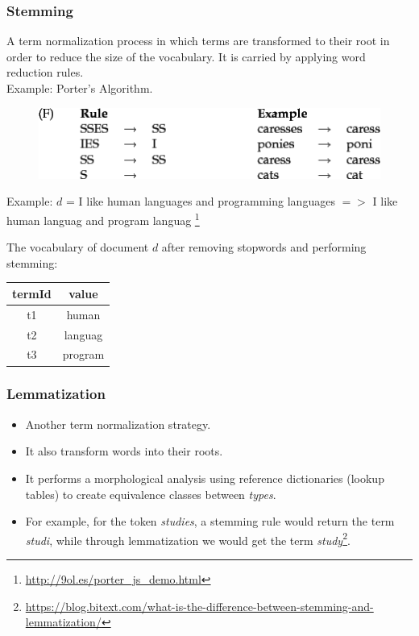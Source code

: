 \documentclass[handout]{beamer}
\begin{document}
\begin{frame}\frametitle{Stemming}
\footnotesize{
A term normalization process in which terms are transformed to their root in order to reduce the size of the vocabulary. It is carried by applying word reduction rules. \\ Example: Porter's Algorithm.

\begin{figure}[h!]
	\centering
	\includegraphics[scale=0.45]{pics/porter.png}
\end{figure}

 Example: $d$ = I like human languages and programming languages $=>$
I like human languag and program languag \footnote{\url{http://9ol.es/porter_js_demo.html}}

The vocabulary of document $d$ after removing stopwords and performing stemming:


\begin{table}
\centering
\begin{tabular}{c|c}
\hline
termId & value \\ 
\hline
t1 & human \\ 
t2 & languag \\ 
t3 & program\\ 
\hline
\end{tabular}
\end{table}

}
 
\end{frame}


\begin{frame}\frametitle{Lemmatization}
\footnotesize{

\begin{itemize}
\item Another term normalization strategy.
 \item It also transform words into their roots.
 \item It performs a morphological analysis using reference dictionaries (lookup tables) to create equivalence classes between \emph{types}.
\item For example, for the token \emph{studies}, a stemming rule would return the term \emph{studi}, while through lemmatization we would get the term \emph{study}\footnote{\url{https://blog.bitext.com/what-is-the-difference-between-stemming-and-lemmatization/}}. 

\end{itemize}





}
\end{frame}
\end{document}
